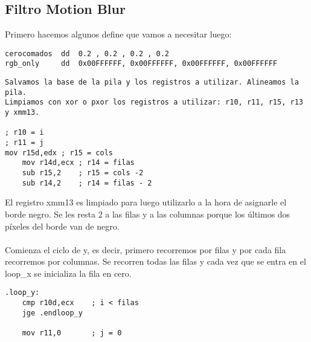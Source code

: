 \documentclass[a4paper]{article}
\begin{document}
\subsection{Filtro Motion Blur}
\indent Primero hacemos algunos define que vamos a necesitar luego:
 \begin{codesnippet}
\begin{verbatim}
cerocomados  dd  0.2 , 0.2 , 0.2 , 0.2
rgb_only     dd  0x00FFFFFF, 0x00FFFFFF, 0x00FFFFFF, 0x00FFFFFF
\end{verbatim}
\end{codesnippet}

 \begin{codesnippet}
\begin{verbatim}
Salvamos la base de la pila y los registros a utilizar. Alineamos la pila.
Limpiamos con xor o pxor los registros a utilizar: r10, r11, r15, r13 y xmm13.

; r10 = i
; r11 = j
mov r15d,edx ; r15 = cols
	mov r14d,ecx ; r14 = filas
	sub r15,2 	 ; r15 = cols -2 
	sub r14,2 	 ; r14 = filas - 2 
\end{verbatim}
\end{codesnippet}

\indent El registro xmm13 es limpiado para luego utilizarlo a la hora de asignarle el borde negro. Se les resta 2 a las filas y a las columnas porque los \'ultimos dos p\'ixeles del borde van de negro.\\
\\
\indent Comienza el ciclo de y, es decir, primero recorremos por filas y por cada fila recorremos por columnas. Se recorren todas las filas y cada vez que se entra en el loop_x se inicializa la fila en cero.
 \begin{codesnippet}
\begin{verbatim}
.loop_y:
    cmp r10d,ecx 	; i < filas 
    jge .endloop_y
	
    mov r11,0 		; j = 0
\end{verbatim}
\end{codesnippet}
\end{document}
